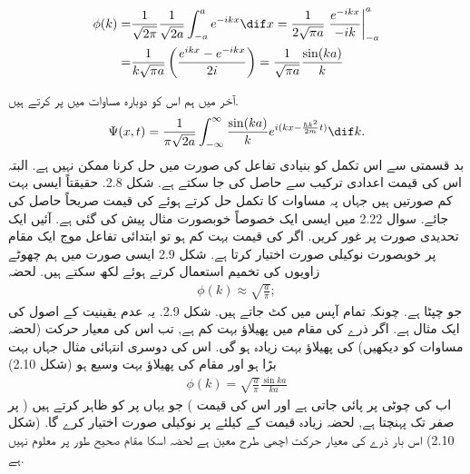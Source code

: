 \begin{align*}
\phi(k) =& \frac{1}{\sqrt{2\pi}} \frac{1}{\sqrt{2a}} \int_{-a}^{a} e^{-ikx} \dif x = \frac{1}{2\sqrt{\pi a}} \left. \frac{e^{-ikx}}{-ik} \right|_{-a}^{a} \\
=& \frac{1}{k\sqrt{\pi a}} \left( \frac{e^{ikx} - e^{-ikx}}{2i} \right) = \frac{1}{\sqrt{\pi a}} \frac{\sin(ka)}{k}
\end{align*}

آخر میں ہم اس کو دوبارہ مساوات  میں پر کرتے ہیں. 
\begin{align}
\Psi (x,t) = \frac{1}{\pi \sqrt{2a}} \int_{-\infty}^{\infty} \frac{\sin (ka)}{k} e^{i(kx-\frac{\hbar k^{2}}{2m}t)} \dif k.
\end{align}
بد قسمتی سے اس تکمل کو بنیادی تفاعل کی صورت میں حل کرنا ممکن نہیں ہے. البتہ اس کی قیمت اعدادی ترکیب سے حاصل کی جا سکتے ہے. شکل 2.8. حقیقتاً ایسی بہت کم صورتیں ہیں جہاں پہ مساوات  کا تکمل حل کرتے ہوئے   کی قیمت صریحاً حاصل کی جائے. 
سوال 2.22 میں ایسی ایک خصوصاً خوبصورت مثال پیش کی گئی ہے.
آئیں ایک تحدیدی صورت پر غور کریں. اگر  کی قیمت بہت کم ہو تو ابتدائی تفاعل موج ایک مقام پر خوبصورت نوکیلی صورت اختیار کرتا ہے. شکل 2.9 ایسی صورت میں ہم چھوٹے زاویوں کی تخمیم استعمال کرتے ہوئے  لکھ سکتے ہیں. لحضہ 
\begin{align*}
\phi (k)  \approx \sqrt{\frac{a}{\pi}};
\end{align*}
جو چپٹا ہے. چونکہ تمام  آپس میں کٹ جاتے ہیں. شکل 2.9. یہ عدم یقینیت کے اصول کی ایک مثال ہے. اگر ذرے کی مقام میں پھیلاؤ بہت کم ہے,  تب اس کی معیار حرکت (لحضہ  مساوات  کو دیکھیں) کی پھیلاؤ بہت زیادہ ہو گی. اس کی دوسری انتہائی مثال جہاں   بہت بڑا ہو اور مقام کی پھیلاؤ بہت وسیع  ہو (شکل 2.10) 
\begin{align*}
\phi (k)  = \sqrt{\frac{a}{\pi}} \frac{\sin ka }{ka }
\end{align*}
اب  کی چوٹی   پر پائی جاتی ہے اور اس کی قیمت   ) جو یہاں پر  کو ظاہر کرتے ہیں ( پر صفر تک پہنچتا ہے, لحضہ زیادہ قیمت کے  کیلئے  پر  نوکیلی صورت اختیار کرے گا. (شکل 2.10)   اس بار ذرے کی معیار حرکت اچھی طرح معین ہے لحضہ اسکا مقام صحیح طور پر معلوم نہیں ہے.

